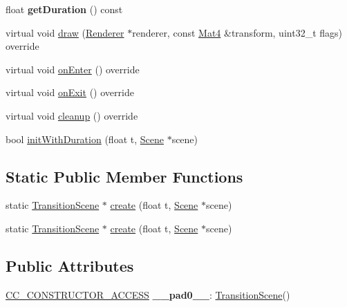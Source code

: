 \begin{DoxyCompactItemize}
float {\bfseries get\+Duration} () const
\item 
virtual void \hyperlink{classTransitionScene_ac66bc3e8b2853b3b7078eea2339c9245}{draw} (\hyperlink{classRenderer}{Renderer} $\ast$renderer, const \hyperlink{classMat4}{Mat4} \&transform, uint32\+\_\+t flags) override
\item 
virtual void \hyperlink{classTransitionScene_a9093cbd324910ea7c9e3955317f7b661}{on\+Enter} () override
\item 
virtual void \hyperlink{classTransitionScene_a05f91bf82d41da86e4a12af07f8242e2}{on\+Exit} () override
\item 
virtual void \hyperlink{classTransitionScene_aac61fc66f0b5447ba999cbfda5d0a926}{cleanup} () override
\item 
bool \hyperlink{classTransitionScene_a8d74011248967a549d855d95056d5db6}{init\+With\+Duration} (float t, \hyperlink{classScene}{Scene} $\ast$scene)
\end{DoxyCompactItemize}
\subsection*{Static Public Member Functions}
\begin{DoxyCompactItemize}
\item 
static \hyperlink{classTransitionScene}{Transition\+Scene} $\ast$ \hyperlink{classTransitionScene_a9e6d44253a5d89c7654dce59a3be2966}{create} (float t, \hyperlink{classScene}{Scene} $\ast$scene)
\item 
static \hyperlink{classTransitionScene}{Transition\+Scene} $\ast$ \hyperlink{classTransitionScene_a48badee255dab1d2d52bebe85c670a10}{create} (float t, \hyperlink{classScene}{Scene} $\ast$scene)
\end{DoxyCompactItemize}
\subsection*{Public Attributes}
\begin{DoxyCompactItemize}
\item 
\mbox{\label{classTransitionScene_a7ef32881f5f3c9934e52112a2f1a4e68}} 
\hyperlink{_2cocos2d_2cocos_2base_2ccConfig_8h_a25ef1314f97c35a2ed3d029b0ead6da0}{C\+C\+\_\+\+C\+O\+N\+S\+T\+R\+U\+C\+T\+O\+R\+\_\+\+A\+C\+C\+E\+SS} {\bfseries \+\_\+\+\_\+pad0\+\_\+\+\_\+}\+: \hyperlink{classTransitionScene}{Transition\+Scene}()
\end{DoxyCompactItemize}
